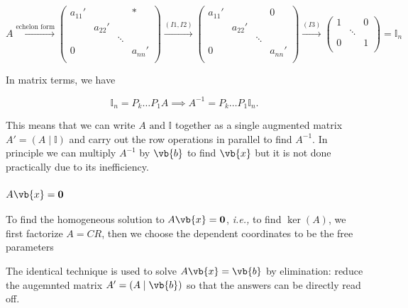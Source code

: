 \documentclass[a4paper,12pt]{report}
\begin{document}
\begin{equation}
    A \xrightarrow{\text{echelon form} } \begin{pmatrix}
        a_{11}'  &  &  & * \\
         & a_{22}'  &  &   \\
         &  & \ddots  &   \\
        0 &  &  & a_{nn}'   \\
    \end{pmatrix} \xrightarrow{(I1,I2)}  \begin{pmatrix}
        a_{11}'  &  &  & 0 \\
         & a_{22}'  &  &   \\
         &  & \ddots  &   \\
        0 &  &  & a_{nn}'   \\
    \end{pmatrix} \xrightarrow{(I3)} \begin{pmatrix}
        1 &  & 0  \\
         & \ddots  &   \\
        0 &  & 1 \\
    \end{pmatrix} = \mathbb{I}_{n} 
\end{equation}

In matrix terms, we have

\begin{equation}
    \mathbb{I}_{n} = P_{k} \ldots P_{1}A \implies A^{-1} = P_{k} \ldots P_{1} \mathbb{I}_{n}.    
\end{equation}

This means that we can write \(A \text { and }  \mathbb{I}\) together as a single augmented matrix \(A'=(A \mid \mathbb{I})\) and carry out the row operations in parallel to find \(A^{-1} \).  In principle we can multiply \(A^{-1} \) by \(\vb{b} \) to find \(\vb{x} \) but it is not done practically due to its inefficiency. 

\subsubsection{\(A\vb{x} = \boldsymbol{0} \) }

To find the homogeneous solution to \(A\vb{x} = \boldsymbol{0} \), \textit{i.e.,} to find \(\ker (A)\), we first factorize \(A = CR\), then we choose the dependent coordinates to be the free parameters 



The identical technique is used to solve \(A\vb{x} =\vb{b} \) by elimination: reduce the augemnted matrix \(A' = (A \mid \vb{b} )\) so that the answers can be directly read off.  
\end{document}

